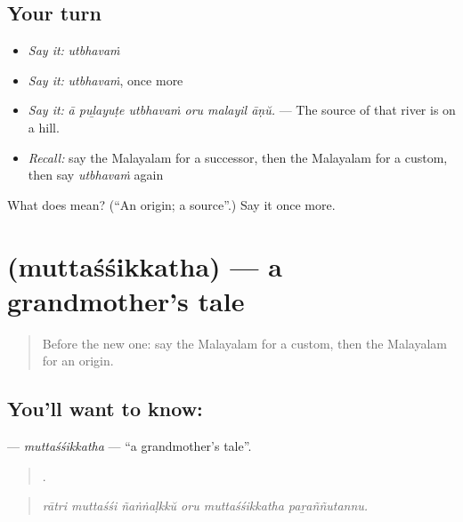 \subsection*{Your turn}
\begin{itemize}
\raggedright
  \item \emph{Say it:} \emph{utbhavaṁ}
  \item \emph{Say it:} \emph{utbhavaṁ}, once more
  \item \emph{Say it:} \emph{ā puḻayuṭe utbhavaṁ oru malayil āṇŭ.} — The source of that river is on a hill.
  \item \emph{Recall:} say the Malayalam for a successor, then the Malayalam for a custom, then say \emph{utbhavaṁ} again
\end{itemize}

\begin{tcolorbox}[breakable,colback=teal!4,colframe=teal!35!black,title={Before you move on}]
What does  mean? (\textquotedblleft{}An origin; a source\textquotedblright{}.) Say it once more.
\end{tcolorbox}
\section[\texorpdfstring{\ml{മുത്തശ്ശിക്കഥ} (muttaśśikkatha)}{മുത്തശ്ശിക്കഥ (muttaśśikkatha)}]{ (muttaśśikkatha) — a grandmother's tale}

\label{lesson:ML-C395-muttassikkatha}



\begin{quote}
Before the new one: say the Malayalam for a custom, then the Malayalam for an origin.
\end{quote}

\subsection*{You'll want to know: }
\textbf{} — \emph{muttaśśikkatha} — \textquotedblleft{}a grandmother's tale\textquotedblright{}.

\begin{quote}
     .
\end{quote}

\begin{quote}
\emph{rātri muttaśśi ñaṅṅaḷkkŭ oru muttaśśikkatha paṟaññutannu.}
\end{quote}

